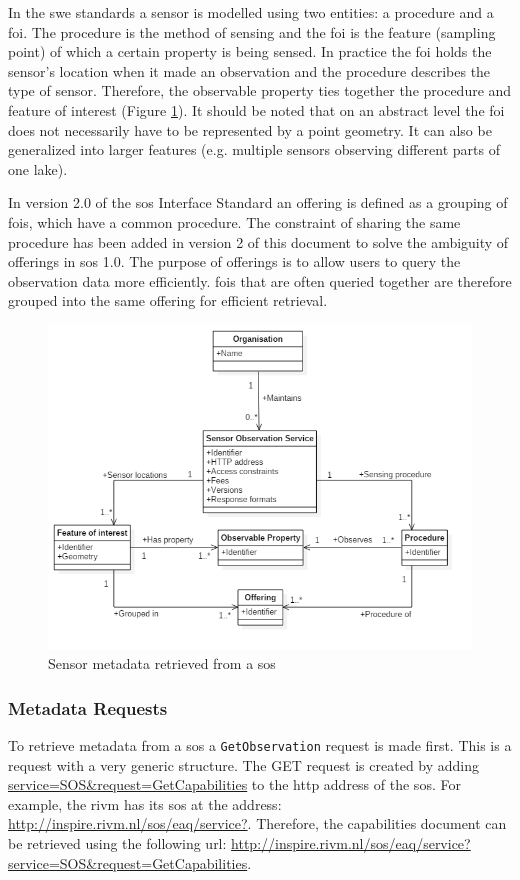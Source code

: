 In the \ac{swe} standards a sensor is modelled using two entities: a procedure and a \acf{foi}. The procedure is the method of sensing and the \ac{foi} is the feature (sampling point) of which a certain property is being sensed. In practice the \ac{foi} holds the sensor's location when it made an observation and the procedure describes the type of sensor. Therefore, the observable property ties together the procedure and feature of interest (Figure \ref{fig:SOS_UML}). It should be noted that on an abstract level the \ac{foi} does not necessarily have to be represented by a point geometry. It can also be generalized into larger features (e.g. multiple sensors observing different parts of one lake). 

In version 2.0 of the \acl{sos} Interface Standard \citep{SW:OGC2} an offering is defined as a grouping of \acp{foi}, which have a common procedure. The constraint of sharing the same procedure has been added in version 2 of this document to solve the ambiguity of offerings in \ac{sos} 1.0. The purpose of offerings is to allow users to query the observation data more efficiently. \acp{foi} that are often queried together are therefore grouped into the same offering for efficient retrieval.        

\begin{figure}
	\centering
	\includegraphics[width=\linewidth]{UML/SOS_UML.PNG}
	\caption{Sensor metadata retrieved from a \ac{sos}}
	\label{fig:SOS_UML}
\end{figure}

\subsubsection{Metadata Requests}
\label{par:metadataRequests}
To retrieve metadata from a \ac{sos} a \texttt{GetObservation} request is made first. This is a request with a very generic structure. The GET request is created by adding \url{service=SOS\&request=GetCapabilities} to the \ac{http} address of the \ac{sos}. For example, the \ac{rivm} has its \ac{sos} at the address: \url{http://inspire.rivm.nl/sos/eaq/service?}. Therefore, the capabilities document can be retrieved using the following \ac{url}: \url{http://inspire.rivm.nl/sos/eaq/service?service=SOS&request=GetCapabilities}. 

